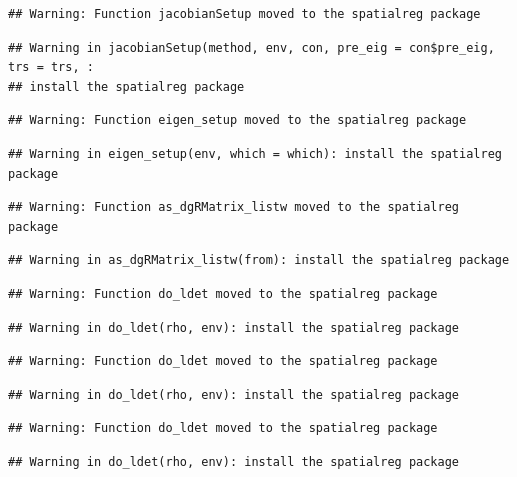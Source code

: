 \documentclass[]{book}
\begin{document}
\begin{verbatim}
## Warning: Function jacobianSetup moved to the spatialreg package
\end{verbatim}

\begin{verbatim}
## Warning in jacobianSetup(method, env, con, pre_eig = con$pre_eig, trs = trs, :
## install the spatialreg package
\end{verbatim}

\begin{verbatim}
## Warning: Function eigen_setup moved to the spatialreg package
\end{verbatim}

\begin{verbatim}
## Warning in eigen_setup(env, which = which): install the spatialreg package
\end{verbatim}

\begin{verbatim}
## Warning: Function as_dgRMatrix_listw moved to the spatialreg package
\end{verbatim}

\begin{verbatim}
## Warning in as_dgRMatrix_listw(from): install the spatialreg package
\end{verbatim}

\begin{verbatim}
## Warning: Function do_ldet moved to the spatialreg package
\end{verbatim}

\begin{verbatim}
## Warning in do_ldet(rho, env): install the spatialreg package
\end{verbatim}

\begin{verbatim}
## Warning: Function do_ldet moved to the spatialreg package
\end{verbatim}

\begin{verbatim}
## Warning in do_ldet(rho, env): install the spatialreg package
\end{verbatim}

\begin{verbatim}
## Warning: Function do_ldet moved to the spatialreg package
\end{verbatim}

\begin{verbatim}
## Warning in do_ldet(rho, env): install the spatialreg package
\end{verbatim}
\end{document}
